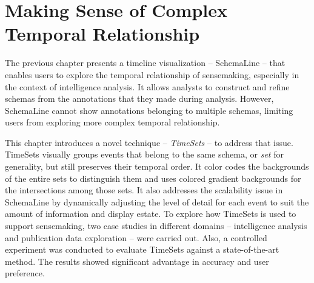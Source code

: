\chapter{Making Sense of Complex Temporal Relationship}
\label{chap:timesets}

\graphicspath{{Chapter4/figures/}}


The previous chapter presents a timeline visualization -- SchemaLine -- that enables users to explore the temporal relationship of sensemaking, especially in the context of intelligence analysis. It allows analysts to construct and refine schemas from the annotations that they made during analysis. However, SchemaLine cannot show annotations belonging to multiple schemas, limiting users from exploring more complex temporal relationship. 

This chapter introduces a novel technique -- \emph{TimeSets} -- to address that issue. TimeSets visually groups events that belong to the same schema, or \emph{set} for generality, but still preserves their temporal order. It color codes the backgrounds of the entire sets to distinguish them and uses colored gradient backgrounds for the intersections among those sets. It also addresses the scalability issue in SchemaLine by dynamically adjusting the level of detail for each event to suit the amount of information and display estate. To explore how TimeSets is used to support sensemaking, two case studies in different domains -- intelligence analysis and publication data exploration -- were carried out. Also, a controlled experiment was conducted to evaluate TimeSets against a state-of-the-art method. The results showed significant advantage in accuracy and user preference.








